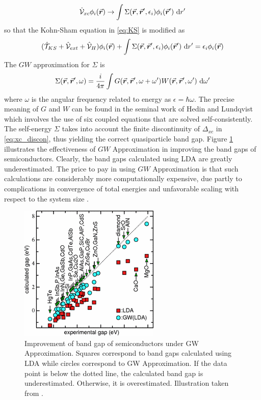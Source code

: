 \begin{equation}
	\hat{\mathcal{V}}_{xc} \phi_i(\va*{r}) \rightarrow \int \Sigma(\va*{r},\va*{r}',\epsilon_i) \phi_i(\va*{r}')  \, \dd{r'}
\end{equation}
so that the Kohn-Sham equation in \eqref{eq:KS} is modified as
\begin{equation}
	(\hat{\mathcal{T}}_{KS} + \hat{\mathcal{V}}_{ext} + \hat{\mathcal{V}}_H) \phi_i(\va*{r})  + \int \Sigma(\va*{r},\va*{r}',\epsilon_i) \phi_i(\va*{r}')  \, \dd{r'} = \epsilon_i \phi_i(\va*{r})
\end{equation}
The $GW$ approximation for $\Sigma$ is \citep{Godby1986}
\begin{equation}
	\Sigma(\va*{r},\va*{r}',\omega) = \frac{i}{4\pi} \int G(\va*{r},\va*{r}',\omega + \omega') W(\va*{r},\va*{r}',\omega') \, \dd{\omega'}
\end{equation}
where $\omega$ is the angular frequency related to energy as $\epsilon = \hbar \omega$. The precise meaning of $G$ and $W$ can be found in the seminal work of Hedin and Lundqvist \citep{Hedin1970} which involves the use of six coupled equations that are solved self-consistently. The self-energy $\Sigma$ takes into account the finite discontinuity of $\Delta_{xc}$ in \eqref{eq:xc_discon}, thus yielding the correct quasiparticle band gap. Figure \ref{fig:GW} illustrates the effectiveness of $GW$ Approximation in improving the band gaps of semiconductors. Clearly, the band gaps calculated using LDA are greatly underestimated. The price to pay in using $GW$ Approximation is that such calculations are considerably more computationally expensive, due partly to complications in convergence of total energies and unfavorable scaling with respect to the system size \citep{Samsonidze2011,Deslippe2013,Gao2016}.

\begin{figure}[tbh!]
	\centering
	\includegraphics[width=0.5\linewidth]{"images/theory/GW"}
	\caption[Improvement of band gap under GW Approximation]{Improvement of band gap of semiconductors under GW Approximation. Squares correspond to band gaps calculated using LDA while circles correspond to GW Approximation. If the data point is below the dotted line, the calculated band gap is underestimated. Otherwise, it is overestimated. Illustration taken from \citep{Schilfgaarde2006}.}
	\label{fig:GW}
\end{figure}

